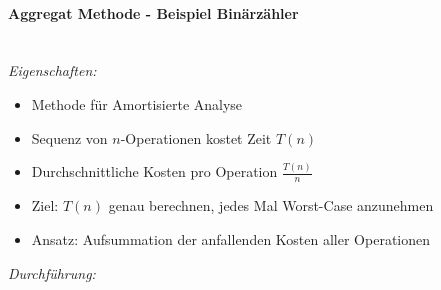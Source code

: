 \documentclass[
    ngerman,
    color=3b,
    load_common, %
    summary,
    boxarc,
]{rubos-tuda-template}
\begin{document}
\clearpage

\paragraph{Aggregat Methode - Beispiel Binärzähler}\mbox{}\vspace{1em}\\
\textit{Eigenschaften:}
\begin{itemize}
    \item Methode für Amortisierte Analyse
    \item Sequenz von $n$-Operationen kostet Zeit $T(n)$
    \item Durchschnittliche Kosten pro Operation $\frac{T(n)}{n}$
    \item Ziel: $T(n)$ genau berechnen,  jedes Mal Worst-Case anzunehmen
    \item Ansatz: Aufsummation der  anfallenden Kosten aller Operationen
\end{itemize}
\textit{Durchführung:}
\end{document}
